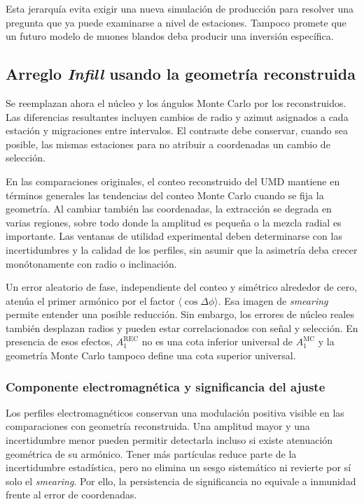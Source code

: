 Esta jerarquía evita exigir una nueva simulación de producción para resolver una pregunta que ya puede examinarse a nivel de estaciones. Tampoco promete que un futuro modelo de muones blandos deba producir una inversión específica.

\subsection{Arreglo \textit{Infill} usando la geometría reconstruida}
\label{subsec:infill_rec}

Se reemplazan ahora el núcleo y los ángulos Monte Carlo por los reconstruidos. Las diferencias resultantes incluyen cambios de radio y azimut asignados a cada estación y migraciones entre intervalos. El contraste debe conservar, cuando sea posible, las mismas estaciones para no atribuir a coordenadas un cambio de selección.

En las comparaciones originales, el conteo reconstruido del UMD mantiene en términos generales las tendencias del conteo Monte Carlo cuando se fija la geometría. Al cambiar también las coordenadas, la extracción se degrada en varias regiones, sobre todo donde la amplitud es pequeña o la mezcla radial es importante. Las ventanas de utilidad experimental deben determinarse con las incertidumbres y la calidad de los perfiles, sin asumir que la asimetría deba crecer monótonamente con radio o inclinación.

Un error aleatorio de fase, independiente del conteo y simétrico alrededor de cero, atenúa el primer armónico por el factor $\langle\cos\Delta\phi\rangle$. Esa imagen de \textit{smearing} permite entender una posible reducción. Sin embargo, los errores de núcleo reales también desplazan radios y pueden estar correlacionados con señal y selección. En presencia de esos efectos, $A_1^{\mathrm{REC}}$ no es una cota inferior universal de $A_1^{\mathrm{MC}}$ y la geometría Monte Carlo tampoco define una cota superior universal.

\subsubsection{Componente electromagnética y significancia del ajuste}

Los perfiles electromagnéticos conservan una modulación positiva visible en las comparaciones con geometría reconstruida. Una amplitud mayor y una incertidumbre menor pueden permitir detectarla incluso si existe atenuación geométrica de su armónico. Tener más partículas reduce parte de la incertidumbre estadística, pero no elimina un sesgo sistemático ni revierte por sí solo el \textit{smearing}. Por ello, la persistencia de significancia no equivale a inmunidad frente al error de coordenadas.

